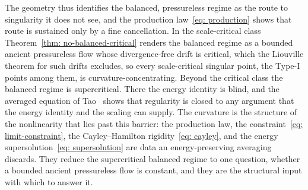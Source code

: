 The geometry thus identifies the balanced, pressureless regime as the route to
singularity it does not see, and the production law~\eqref{eq: production} shows
that route is sustained only by a fine cancellation. In the scale-critical class
Theorem~\ref{thm: no-balanced-critical} renders the balanced regime as a bounded
ancient pressureless flow whose divergence-free drift is critical, which the
Liouville theorem for such drifts excludes, so every scale-critical singular point,
the Type-I points among them, is curvature-concentrating. Beyond the critical class
the balanced regime is supercritical. There the energy identity is blind, and the
averaged equation of Tao~\cite{tao-2016-fin-tim-blo} shows that regularity is closed
to any argument that the energy identity and the scaling can supply. The curvature
is the structure of the nonlinearity that lies past this barrier: the
production law, the constraint~\eqref{eq: limit-constraint}, the Cayley--Hamilton
rigidity~\eqref{eq: cayley}, and the energy supersolution~\eqref{eq: supersolution}
are data an energy-preserving averaging discards. They reduce the supercritical
balanced regime to one question, whether a bounded ancient pressureless flow is
constant, and they are the structural input with which to answer it.
